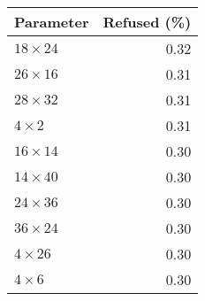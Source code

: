 \begin{tabular}{lr}
\toprule
      Parameter &  Refused (\%) \\
\midrule
 $18 \times 24$ &          0.32 \\
 $26 \times 16$ &          0.31 \\
 $28 \times 32$ &          0.31 \\
   $4 \times 2$ &          0.31 \\
 $16 \times 14$ &          0.30 \\
 $14 \times 40$ &          0.30 \\
 $24 \times 36$ &          0.30 \\
 $36 \times 24$ &          0.30 \\
  $4 \times 26$ &          0.30 \\
   $4 \times 6$ &          0.30 \\
\bottomrule
\end{tabular}


